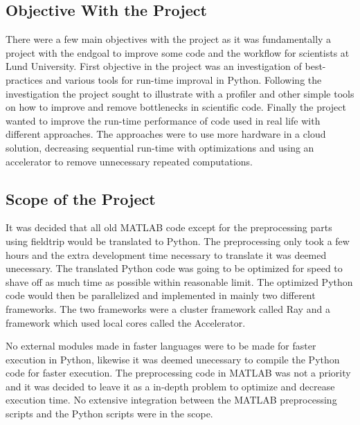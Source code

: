 \documentclass[12pt, a4paper]{article}
\begin{document}
\subsection{Objective With the Project}%

There were a few main objectives with the project as it was fundamentally a project with the endgoal to improve some code and the workflow for scientists at Lund University.
First objective in the project was an investigation of best-practices and various tools for run-time improval in Python.
Following the investigation the project sought to illustrate with a profiler and other simple tools on how to improve and remove bottlenecks in scientific code.
Finally the project wanted to improve the run-time performance of code used in real life with different approaches.
The approaches were to use more hardware in a cloud solution, decreasing sequential run-time with optimizations and using an accelerator to remove unnecessary repeated computations.

\subsection{Scope of the Project}%

It was decided that all old MATLAB code except for the preprocessing parts using fieldtrip would be translated to Python.
The preprocessing only took a few hours and the extra development time necessary to translate it was deemed unecessary. 
The translated Python code was going to be optimized for speed to shave off as much time as possible within reasonable limit.
The optimized Python code would then be parallelized and implemented in mainly two different frameworks.
The two frameworks were a cluster framework called Ray and a framework which used local cores called the Accelerator.

No external modules made in faster languages were to be made for faster execution in Python, likewise it was deemed unecessary to compile the Python code for faster execution.
The preprocessing code in MATLAB was not a priority and it was decided to leave it as a in-depth problem to optimize and decrease execution time.
No extensive integration between the MATLAB preprocessing scripts and the Python scripts were in the scope.

\end{document}
